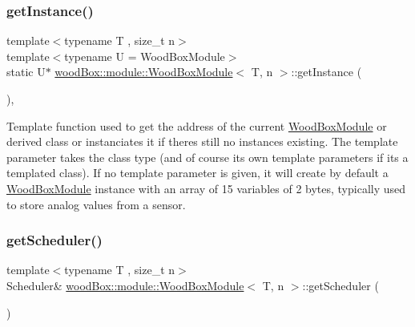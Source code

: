 \subsubsection{\texorpdfstring{get\+Instance()}{getInstance()}}
{\footnotesize\ttfamily template$<$typename T , size\+\_\+t n$>$ \\
template$<$typename U  = Wood\+Box\+Module$>$ \\
static U$\ast$ \mbox{\hyperlink{classwood_box_1_1module_1_1_wood_box_module}{wood\+Box\+::module\+::\+Wood\+Box\+Module}}$<$ T, n $>$\+::get\+Instance (\begin{DoxyParamCaption}{ }\end{DoxyParamCaption})\hspace{0.3cm}{\ttfamily [inline]}, {\ttfamily [static]}}

Template function used to get the address of the current \mbox{\hyperlink{classwood_box_1_1module_1_1_wood_box_module}{Wood\+Box\+Module}} or derived class or instanciates it if there\textquotesingle{}s still no instances existing. The template parameter takes the class type (and of course it\textquotesingle{}s own template parameters if it\textquotesingle{}s a templated class). If no template parameter is given, it will create by default a \mbox{\hyperlink{classwood_box_1_1module_1_1_wood_box_module}{Wood\+Box\+Module}} instance with an array of 15 variables of 2 bytes, typically used to store analog values from a sensor. \mbox{\label{classwood_box_1_1module_1_1_wood_box_module_a24b14dd95e7b1c5a7ba31107cd0c524d}} 
\subsubsection{\texorpdfstring{get\+Scheduler()}{getScheduler()}}
{\footnotesize\ttfamily template$<$typename T , size\+\_\+t n$>$ \\
Scheduler\& \mbox{\hyperlink{classwood_box_1_1module_1_1_wood_box_module}{wood\+Box\+::module\+::\+Wood\+Box\+Module}}$<$ T, n $>$\+::get\+Scheduler (\begin{DoxyParamCaption}{ }\end{DoxyParamCaption})\hspace{0.3cm}{\ttfamily [inline]}}

